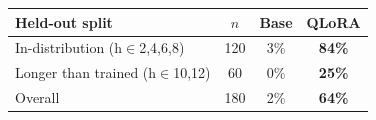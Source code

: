 \begin{tabular}{lccc}
\toprule
Held-out split & $n$ & Base & QLoRA \\
\midrule
In-distribution (h$\in${2,4,6,8}) & 120 & 3\% & \textbf{84\%} \\
Longer than trained (h$\in${10,12}) & 60 & 0\% & \textbf{25\%} \\
\midrule
Overall & 180 & 2\% & \textbf{64\%} \\
\bottomrule
\end{tabular}
